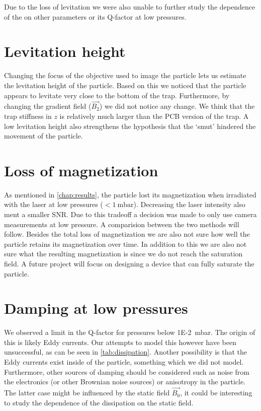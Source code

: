 Due to the loss of levitation we were also unable to further study the dependence of the \zmode on other parameters or its Q-factor at low pressures.

\section*{Levitation height}
Changing the focus of the objective used to image the particle lets us estimate the levitation height of the particle. Based on this we noticed that the particle appears to levitate very close to the bottom of the trap. Furthermore, by changing the gradient field ($\vec{B_2}$) we did not notice any change. We think that the trap stiffness in $z$ is relatively much larger than the PCB version of the trap. A low levitation height also strengthens the hypothesis that the `smut' hindered the movement of the particle.

\section*{Loss of magnetization}
As mentioned in \autoref{chap:results}, the particle lost its magnetization when irradiated with the laser at low pressures ($<\qty{1}{\milli\bar}$). Decreasing the laser intensity also ment a smaller SNR. Due to this tradeoff a decision was made to only use camera measurements at low pressure. A comparision between the two methods will follow. Besides the total loss of magnetization we are also not sure how well the particle retains its magnetization over time. In addition to this we are also not sure what the resulting magnetization is since we do not reach the saturation field. A future project will focus on designing a device that can fully saturate the particle.

\section*{Damping at low pressures}
We observed a limit in the Q-factor for pressures below \qty{1E-2}{\milli\bar}. The origin of this is likely Eddy currents. Our attempts to model this however have been unsuccessful, as can be seen in \autoref{tab:dissipation}. Another possibility is that the Eddy currents exist inside of the particle, something which we did not model. Furthermore, other sources of damping should be considered such as noise from the electronics (or other Brownian noise sources) or anisotropy in the particle\cite{millen}. The latter case might be influenced by the static field $\vec{B_0}$, it could be interesting to study the dependence of the dissipation on the static field.

